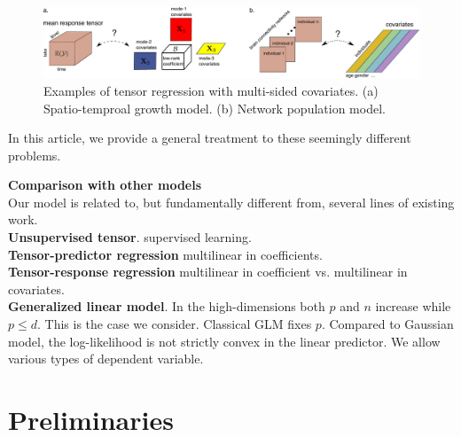 \documentclass[twoside]{article}
\theoremstyle{plain}
\theoremstyle{definition}
\begin{document}
\begin{figure}
\begin{center}
\includegraphics[width=17cm]{demo.pdf}
  \end{center}
\caption{Examples of tensor regression with multi-sided covariates. (a) Spatio-temproal growth model. (b) Network population model.}
  \end{figure}

In this article, we provide a general treatment to these seemingly different problems.

{\bf Comparison with other models}\\
Our model is related to, but fundamentally different from, several lines of existing work.\\
{\bf Unsupervised tensor}. supervised learning. \\
{\bf Tensor-predictor regression} multilinear in coefficients. \\
{\bf Tensor-response regression} multilinear in coefficient vs. multilinear in covariates. \\
{\bf Generalized linear model}. In the high-dimensions both $p$ and $n$ increase while $p \leq d$. This is the case we consider. Classical GLM fixes $p$. Compared to Gaussian model, the log-likelihood is not strictly convex in the linear predictor. We allow various types of dependent variable. 



\section{Preliminaries}
\end{document}
